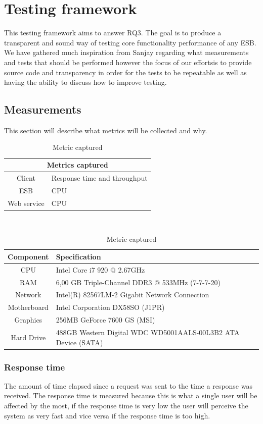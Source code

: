 \section{Testing framework}
This testing framework aims to answer RQ3. The goal is to produce a transparent and sound way of testing core functionality \cite{lit review} performance of any ESB. 
We have gathered much inspiration from Sanjay \cite{Sanjay} regarding what measurements and tests that should be performed however the focus of our effortsis to provide source code and transparency in order for the tests to be repeatable as well as having the ability to discuss how to improve testing.

\subsection{Measurements}
This section will describe what metrics will be collected and why.\\

\begin{table}
	\caption{Metric captured}
	\begin{tabular}{c l}
		\multicolumn{2}{c}{Metrics captured} \\
		\hline
		Client & Response time and throughput \\
		ESB & CPU \\ 
		Web service &  CPU \\
		\hline
	\end{tabular} \\

	
	\begin{tabular}{c l}
		Component & Specification \\ 
		\hline
		CPU & Intel Core i7 920 @ 2.67GHz  \\
		RAM &  6,00 GB Triple-Channel DDR3 @ 533MHz (7-7-7-20) \\
		Network &  Intel(R) 82567LM-2 Gigabit Network Connection \\
		Motherboard &  Intel Corporation DX58SO (J1PR) \\
		Graphics &  256MB GeForce 7600 GS (MSI) \\
		Hard Drive &  488GB Western Digital WDC WD5001AALS-00L3B2 ATA Device (SATA) \\
		\hline
	\end{tabular} 
\end{table}
\subsubsection{Response time}
The amount of time elapsed since a request was sent to the time a response was received. 
The response time is measured because this is what a single user will be affected by the most, if the response time is very low the user will perceive the system as very fast and vice versa if the response time is too high.
